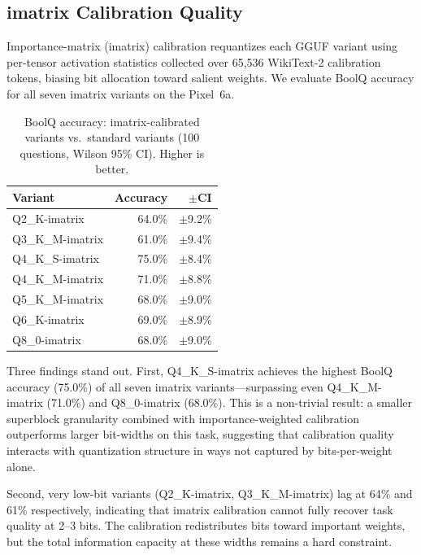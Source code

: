 \documentclass[conference]{IEEEtran}
\begin{document}
\subsection{imatrix Calibration Quality}
\label{sec:imatrix}

Importance-matrix (imatrix) calibration requantizes each GGUF variant using
per-tensor activation statistics collected over 65{,}536 WikiText-2 calibration
tokens, biasing bit allocation toward salient weights. We evaluate BoolQ
accuracy for all seven imatrix variants on the Pixel~6a.

\begin{table}[ht]
\centering
\caption{BoolQ accuracy: imatrix-calibrated variants vs.\ standard variants
(100 questions, Wilson 95\% CI). Higher is better.}
\label{tab:imatrix_boolq}
\begin{tabular}{lrr}
\toprule
\textbf{Variant} & \textbf{Accuracy} & \textbf{$\pm$CI} \\
\midrule
Q2\_K-imatrix   & 64.0\% & $\pm$9.2\% \\
Q3\_K\_M-imatrix & 61.0\% & $\pm$9.4\% \\
Q4\_K\_S-imatrix & 75.0\% & $\pm$8.4\% \\
Q4\_K\_M-imatrix & 71.0\% & $\pm$8.8\% \\
Q5\_K\_M-imatrix & 68.0\% & $\pm$9.0\% \\
Q6\_K-imatrix   & 69.0\% & $\pm$8.9\% \\
Q8\_0-imatrix   & 68.0\% & $\pm$9.0\% \\
\bottomrule
\end{tabular}
\end{table}

Three findings stand out. First, Q4\_K\_S-imatrix achieves the highest BoolQ
accuracy (75.0\%) of all seven imatrix variants---surpassing even Q4\_K\_M-imatrix
(71.0\%) and Q8\_0-imatrix (68.0\%). This is a non-trivial result: a smaller
superblock granularity combined with importance-weighted calibration outperforms
larger bit-widths on this task, suggesting that calibration quality interacts
with quantization structure in ways not captured by bits-per-weight alone.

Second, very low-bit variants (Q2\_K-imatrix, Q3\_K\_M-imatrix) lag at
64\% and 61\% respectively, indicating that imatrix calibration cannot fully
recover task quality at 2--3 bits. The calibration redistributes bits toward
important weights, but the total information capacity at these widths remains
a hard constraint.
\end{document}
